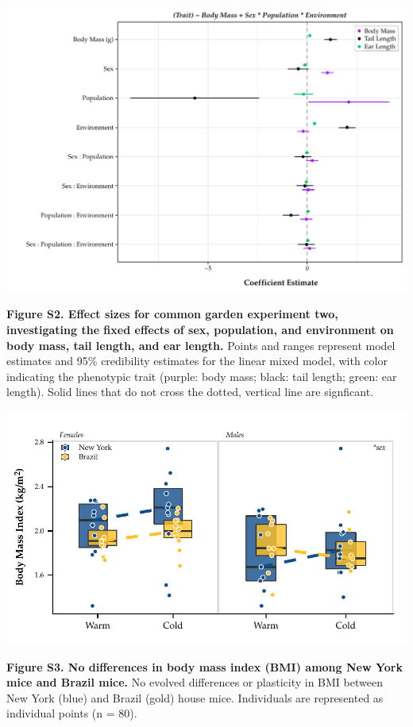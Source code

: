 \documentclass[]{article}
\begin{document}
\includegraphics{../results/figures/RXNsModel.pdf}

\textbf{Figure S2. Effect sizes for common garden experiment two,
investigating the fixed effects of sex, population, and environment on
body mass, tail length, and ear length.} Points and ranges represent
model estimates and 95\% credibility estimates for the linear mixed
model, with color indicating the phenotypic trait (purple: body mass;
black: tail length; green: ear length). Solid lines that do not cross
the dotted, vertical line are signficant.

\newpage

\includegraphics{../results/figures/RXNs_BMI.pdf}

\textbf{Figure S3. No differences in body mass index (BMI) among New
York mice and Brazil mice.} No evolved differences or plasticity in BMI
between New York (blue) and Brazil (gold) house mice. Individuals are
represented as individual points (n = 80).
\end{document}
